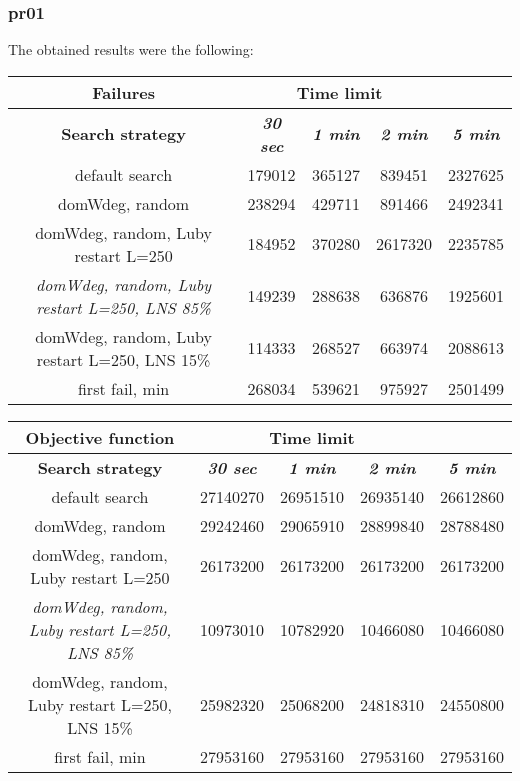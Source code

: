 \subsubsection{pr01}
The obtained results were the following:
{
\renewcommand{\arraystretch}{2}
\begin{longtable}[h]{| c | c | c | c | c |}
    \hline
    \textbf{Failures} & \multicolumn{3}{c}{Time limit} & \\
    \hline
    \textbf{Search strategy} & \textbf{\textit{30 sec}} & \textbf{\textit{1 min}} & \textbf{\textit{2 min}} & \textbf{\textit{5 min}} \\
    \hline
    \endhead
    default search                                         & 179012 & 365127 &  839451 & 2327625 \\
    \hline
    domWdeg, random                                        & 238294 & 429711 &  891466 & 2492341 \\
    \hline
    domWdeg, random, Luby restart L=250                    & 184952 & 370280 & 2617320 & 2235785 \\
    \hline
    \textit{domWdeg, random, Luby restart L=250, LNS 85\%} & 149239 & 288638 &  636876 & 1925601 \\
    \hline
    domWdeg, random, Luby restart L=250, LNS 15\%          & 114333 & 268527 &  663974 & 2088613 \\
    \hline
    first fail, min                                        & 268034 & 539621 &  975927 & 2501499 \\
    \hline
\end{longtable}
}

{
\renewcommand{\arraystretch}{2}
\begin{longtable}[h]{| c | c | c | c | c |}
    \hline
    \textbf{Objective function} & \multicolumn{3}{c}{Time limit} & \\
    \hline
    \textbf{Search strategy} & \textbf{\textit{30 sec}} & \textbf{\textit{1 min}} & \textbf{\textit{2 min}} & \textbf{\textit{5 min}} \\
    \hline
    \endhead
    default search                                         & 27140270 & 26951510 & 26935140 & 26612860 \\
    \hline
    domWdeg, random                                        & 29242460 & 29065910 & 28899840 & 28788480 \\
    \hline
    domWdeg, random, Luby restart L=250                    & 26173200 & 26173200 & 26173200 & 26173200 \\
    \hline
    \textit{domWdeg, random, Luby restart L=250, LNS 85\%} & 10973010 & 10782920 & 10466080 & 10466080 \\
    \hline
    domWdeg, random, Luby restart L=250, LNS 15\%          & 25982320 & 25068200 & 24818310 & 24550800 \\
    \hline
    first fail, min                                        & 27953160 & 27953160 & 27953160 & 27953160 \\
    \hline
\end{longtable}
}